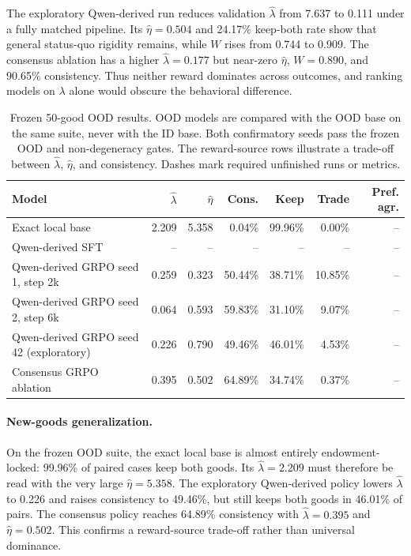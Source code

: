 \documentclass[letterpaper]{article} %
\begin{document}
The exploratory Qwen-derived run reduces validation
$\widehat\lambda$ from 7.637 to 0.111 under a fully matched pipeline. Its
$\widehat\eta=0.504$ and 24.17\% keep-both rate show that general status-quo
rigidity remains, while $W$ rises from 0.744 to 0.909. The consensus ablation
has a higher $\widehat\lambda=0.177$ but near-zero $\widehat\eta$, $W=0.890$,
and 90.65\% consistency. Thus neither reward dominates across outcomes, and
ranking models on $\lambda$ alone would obscure the behavioral difference.

\begin{table}[t]
\centering
\small
\begin{tabular}{lrrrrrr}
\toprule
Model & $\widehat\lambda$ & $\widehat\eta$ & Cons. & Keep & Trade & Pref. agr. \\
\midrule
Exact local base & 2.209 & 5.358 & 0.04\% & 99.96\% & 0.00\% & -- \\
Qwen-derived SFT & -- & -- & -- & -- & -- & -- \\
Qwen-derived GRPO seed 1, step 2k & 0.259 & 0.323 & 50.44\% & 38.71\% & 10.85\% & -- \\
Qwen-derived GRPO seed 2, step 6k & 0.064 & 0.593 & 59.83\% & 31.10\% & 9.07\% & -- \\
Qwen-derived GRPO seed 42 (exploratory) & 0.226 & 0.790 & 49.46\% & 46.01\% & 4.53\% & -- \\
Consensus GRPO ablation & 0.395 & 0.502 & 64.89\% & 34.74\% & 0.37\% & -- \\
\bottomrule
\end{tabular}
\caption{Frozen 50-good OOD results. OOD models are compared with the OOD base
on the same suite, never with the ID base. Both confirmatory seeds pass the
frozen OOD and non-degeneracy gates. The reward-source rows illustrate a
trade-off between $\widehat\lambda$, $\widehat\eta$, and consistency.
Dashes mark required unfinished runs or metrics.}
\label{tab:ood-main}
\end{table}

\paragraph{New-goods generalization.}
On the frozen OOD suite, the exact local base is almost entirely
endowment-locked: 99.96\% of paired cases keep both goods. Its
$\widehat\lambda=2.209$ must therefore be read with the very large
$\widehat\eta=5.358$. The exploratory Qwen-derived policy lowers
$\widehat\lambda$ to 0.226 and raises consistency to 49.46\%, but still keeps
both goods in 46.01\% of pairs. The consensus policy reaches 64.89\%
consistency with $\widehat\lambda=0.395$ and $\widehat\eta=0.502$. This
confirms a reward-source trade-off rather than universal dominance.
\end{document}
